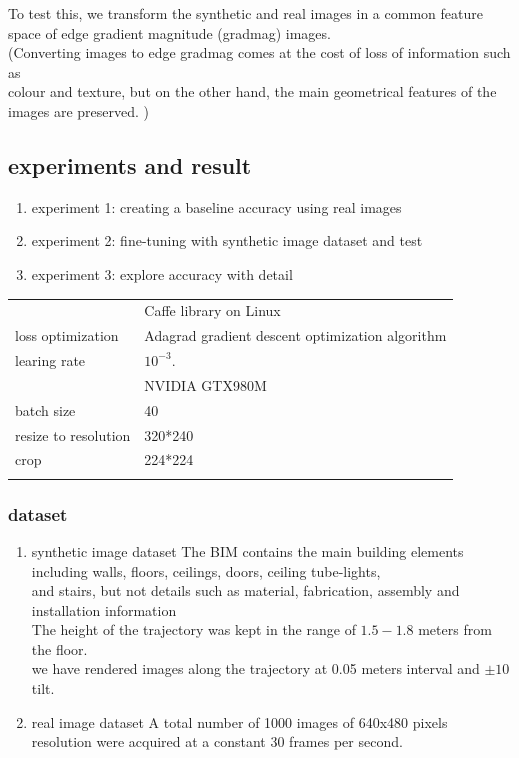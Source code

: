 \documentclass[11pt]{article}
\begin{document}
To test this, we transform the synthetic and real images in a common feature space of edge gradient magnitude (gradmag) images. \\
(Converting images to edge gradmag comes at the cost of loss of information such as \\
colour and texture, but on the other hand, the main geometrical features of the images are preserved. ) \\
\subsection{experiments and result}
\label{sec-5-4}
\begin{enumerate}
\item experiment 1: creating a baseline accuracy using real images \\
\item experiment 2: fine-tuning with synthetic image dataset and test \\
\item experiment 3: explore accuracy with detail \\
\end{enumerate}

\begin{center}
\begin{tabular}{ll}
 & Caffe library on Linux\\
loss optimization & Adagrad gradient descent optimization algorithm\\
learing rate & $10^{-3}$.\\
 & NVIDIA GTX980M\\
batch size & 40\\
resize to resolution & 320*240\\
crop & 224*224\\
 & \\
\end{tabular}
\end{center}
\subsubsection{dataset}
\label{sec-5-4-1}
\begin{enumerate}
\item synthetic image dataset
\label{sec-5-4-1-1}
The BIM contains the main building elements including walls, floors, ceilings, doors, ceiling tube-lights, \\
and stairs, but not details such as material, fabrication, assembly and installation information \\

The height of the trajectory was kept in the range of $1.5 - 1.8$ meters from the floor. \\

we have rendered images along the trajectory at 0.05 meters interval and $\pm 10$ tilt. \\
\item real image dataset
\label{sec-5-4-1-2}
A total number of 1000 images of 640x480 pixels resolution were acquired at a constant 30 frames per second. \\
\end{enumerate}
\end{document}
